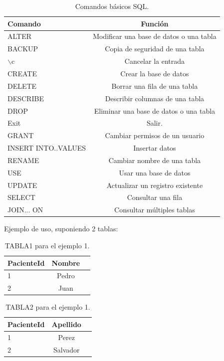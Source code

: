 \begin{table}[h]
	\centering
	\caption[Comandos SQL]{Comandos básicos SQL.}
	\begin{tabular}{l c }    
		\toprule
		\textbf{Comando}     & \textbf{Función} \\
		\midrule
		ALTER & Modificar una base de datos o una tabla    \\		
		BACKUP    & Copia de seguridad de una tabla      \\
		$\backslash$c  & Cancelar la entrada\\
		CREATE  & Crear la base de datos\\
		DELETE  & Borrar una fila de una tabla\\
		DESCRIBE  & Describir columnas de una tabla\\
		DROP  & Eliminar una base de datos o una tabla\\
		Exit & Salir.\\
		GRANT & Cambiar permisos de un usuario\\
		INSERT INTO..VALUES & Insertar datos\\
		RENAME & Cambiar nombre de una tabla\\
		USE & Usar una base de datos\\
		UPDATE & Actualizar un registro existente\\
		SELECT  & Consultar una fila\\
		JOIN... ON & Consultar múltiples tablas\\
		\bottomrule
		\hline
	\end{tabular}
	\label{tab:Funciones SQL}
\end{table}
\pagebreak
Ejemplo de uso, suponiendo 2 tablas:

\begin{table}[h]
	\centering
	\caption[Tabla 1 Ejemplo SQL]{TABLA1 para el ejemplo 1.}
	\begin{tabular}{l c c}    
		\toprule
		\textbf{PacienteId}     & \textbf{Nombre} \\
		\midrule
		 1& Pedro    \\		
 		 2& Juan    \\				
		\bottomrule
		\hline
	\end{tabular}
	\label{tab:Ejemplo 1}
\end{table}
\pagebreak
\begin{table}[h]
	\centering
	\caption[Tabla 2 Ejemplo SQL]{TABLA2 para el ejemplo 1.}
	\begin{tabular}{l c c}    
		\toprule
		\textbf{PacienteId}     & \textbf{Apellido} \\
		\midrule
		 1& Perez    \\		
 		 2& Salvador    \\	
		\bottomrule
		\hline
	\end{tabular}
	\label{tab:Ejemplo 2}
\end{table}

